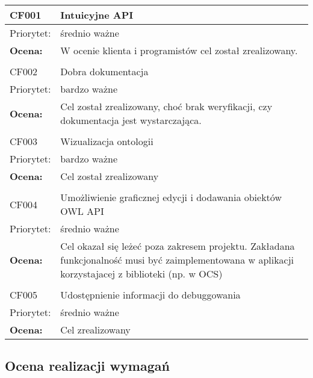 
\begin{center}

\begin{tabular}{|m{3cm}|m{9cm}|} \hline

CF001 & Intuicyjne API \\ \hline
Priorytet: & średnio ważne  \\ \hline
\textbf{Ocena:} & W ocenie klienta i programistów cel został zrealizowany. \\ \hline
\multicolumn{2}{c}{} \\

 \hline
CF002 & Dobra dokumentacja \\ \hline
Priorytet: & bardzo ważne \\ \hline
\textbf{Ocena:} & Cel został zrealizowany, choć brak weryfikacji, czy dokumentacja jest wystarczająca. \\ \hline
\multicolumn{2}{c}{} \\
 \hline
CF003 & Wizualizacja ontologii \\ \hline
Priorytet: & bardzo ważne \\ \hline
\textbf{Ocena:} & Cel został zrealizowany \\ \hline
\multicolumn{2}{c}{} \\
 \hline
CF004 & Umożliwienie graficznej edycji i dodawania obiektów OWL API \\ \hline
Priorytet: & średnio ważne \\ \hline
\textbf{Ocena:} & Cel okazał się leżeć poza zakresem projektu. Zakładana funkcjonalność musi być zaimplementowana w aplikacji korzystajacej z biblioteki (np. w OCS) \\ \hline
\multicolumn{2}{c}{} \\


 \hline

CF005 & Udostępnienie informacji do debuggowania  \\ \hline
Priorytet: & średnio ważne \\ \hline
\textbf{Ocena:} & Cel zrealizowany \\ \hline
\end{tabular}

\end{center}




\subsection{Ocena realizacji wymagań}

